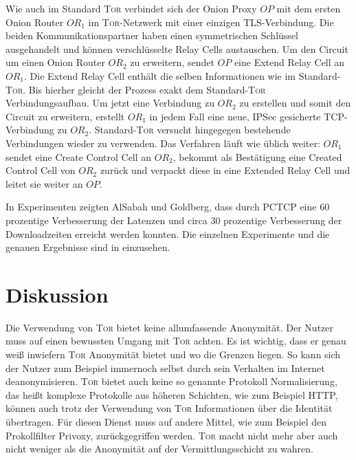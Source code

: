 \documentclass[fleqn,envcountsame,runningheads,10pt,a4paper]{llncs}
\begin{document}
Wie auch im Standard \textsc{Tor} verbindet sich der Onion Proxy $\textit{OP}$ mit dem ersten Onion Router $\textit{OR}_1$ im \textsc{Tor}-Netzwerk mit einer einzigen TLS-Verbindung. Die beiden Kommunikationspartner haben einen symmetrischen Schlüssel ausgehandelt und können verschlüsselte Relay Cells austauschen. Um den Circuit um einen Onion Router $\textit{OR}_2$ zu erweitern, sendet $\textit{OP}$ eine Extend Relay Cell an $\textit{OR}_1$. Die Extend Relay Cell enthält die selben Informationen wie im Standard-\textsc{Tor}. Bis hierher gleicht der Prozess exakt dem Standard-\textsc{Tor} Verbindungsaufbau. Um jetzt eine Verbindung zu $\textit{OR}_2$ zu erstellen und somit den Circuit zu erweitern, erstellt $\textit{OR}_1$ in jedem Fall eine neue, IPSec gesicherte TCP-Verbindung zu $\textit{OR}_2$. Standard-\textsc{Tor} versucht hingegegen bestehende Verbindungen wieder zu verwenden. Das Verfahren läuft wie üblich weiter: $\textit{OR}_1$ sendet eine Create Control Cell an $\textit{OR}_2$, bekommt als Bestätigung eine Created Control Cell von $\textit{OR}_2$ zurück und verpackt diese in eine Extended Relay Cell und leitet sie weiter an $\textit{OP}$.

In Experimenten zeigten AlSabah und Goldberg, dass durch PCTCP eine 60 prozentige Verbesserung der Latenzen und circa 30 prozentige Verbesserung der Downloadzeiten erreicht werden konnten.
Die einzelnen Experimente und die genauen Ergebnisse sind in \cite{pctcp} einzusehen.


\section{Diskussion}
\label{sec:discussion}

Die Verwendung von \textsc{Tor} bietet keine allumfassende Anonymität. Der Nutzer muss auf einen bewussten Umgang mit \textsc{Tor} achten. Es ist wichtig, dass er genau weiß inwiefern \textsc{Tor} Anonymität bietet und wo die Grenzen liegen. So kann sich der Nutzer zum Beispiel immernoch selbst durch sein Verhalten im Internet deanonymisieren. \textsc{Tor} bietet auch keine so genannte Protokoll Normalisierung, das heißt komplexe Protokolle aus höheren Schichten, wie zum Beispiel HTTP, können auch trotz der Verwendung von \textsc{Tor} Informationen über die Identität übertragen. Für diesen Dienst muss auf andere Mittel, wie zum Beispiel den Prokollfilter Privoxy, zurückgegriffen werden. \textsc{Tor} macht nicht mehr aber auch nicht weniger als die Anonymität auf der Vermittlungsschicht zu wahren.
\end{document}
